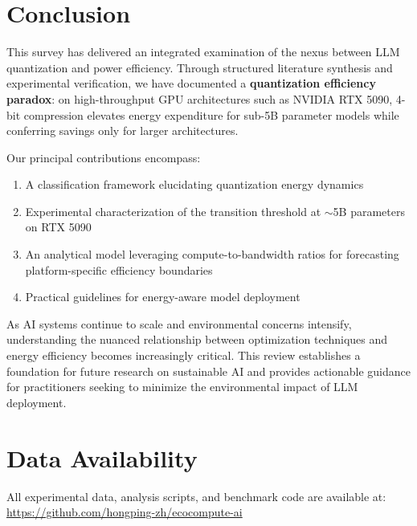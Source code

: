 \documentclass[11pt]{article}
\begin{document}
\section{Conclusion}
\label{sec:conclusion}

This survey has delivered an integrated examination of the nexus between LLM quantization and power efficiency. Through structured literature synthesis and experimental verification, we have documented a \textbf{quantization efficiency paradox}: on high-throughput GPU architectures such as NVIDIA RTX 5090, 4-bit compression elevates energy expenditure for sub-5B parameter models while conferring savings only for larger architectures.

Our principal contributions encompass:
\begin{enumerate}
    \item A classification framework elucidating quantization energy dynamics
    \item Experimental characterization of the transition threshold at $\sim$5B parameters on RTX 5090
    \item An analytical model leveraging compute-to-bandwidth ratios for forecasting platform-specific efficiency boundaries
    \item Practical guidelines for energy-aware model deployment
\end{enumerate}

As AI systems continue to scale and environmental concerns intensify, understanding the nuanced relationship between optimization techniques and energy efficiency becomes increasingly critical. This review establishes a foundation for future research on sustainable AI and provides actionable guidance for practitioners seeking to minimize the environmental impact of LLM deployment.

\section*{Data Availability}

All experimental data, analysis scripts, and benchmark code are available at: \url{https://github.com/hongping-zh/ecocompute-ai}
\end{document}
